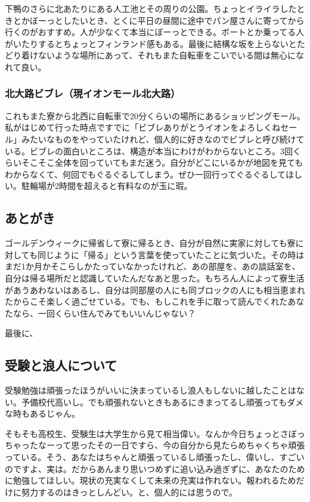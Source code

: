 下鴨のさらに北あたりにある人工池とその周りの公園。ちょっとイライラしたときとかぼーっとしたいとき、とくに平日の昼間に途中でパン屋さんに寄ってから行くのがおすすめ。人が少なくて本当にぼーっとできる。ボートとか乗ってる人がいたりするとちょっとフィンランド感もある。最後に結構な坂を上らないとたどり着けないような場所にあって、それもまた自転車をこいでいる間は無心になれて良い。

\subsubsection{北大路ビブレ（現イオンモール北大路）}
これもまた寮から北西に自転車で20分くらいの場所にあるショッピングモール。私がはじめて行った時点ですでに「ビブレありがとうイオンをよろしくねセール」みたいなものをやっていたけれど、個人的に好きなのでビブレと呼び続けている。ビブレの面白いところは、構造が本当にわけがわからないところ。3回くらいそこそこ全体を回っていてもまだ迷う。自分がどこにいるかが地図を見てもわからなくて、何回でもぐるぐるしてしまう。ぜひ一回行ってぐるぐるしてほしい。駐輪場が2時間を超えると有料なのが玉に瑕。

\subsection{あとがき}
ゴールデンウィークに帰省して寮に帰るとき、自分が自然に実家に対しても寮に対しても同じように「帰る」という言葉を使っていたことに気づいた。その時はまだ1か月かそこらしかたっていなかったけれど、あの部屋を、あの談話室を、自分は帰る場所だと認識していたんだなあと思った。もちろん人によって寮生活があうあわないはあるし、自分は同部屋の人にも同ブロックの人にも相当恵まれたからこそ楽しく過ごせている。でも、もしこれを手に取って読んでくれたあなたなら、一回くらい住んでみてもいいんじゃない？

\tatespace
最後に、
\subsection{受験と浪人について}
受験勉強は頑張ったほうがいいに決まっているし浪人もしないに越したことはない。予備校代高いし。でも頑張れないときもあるにきまってるし頑張ってもダメな時もあるじゃん。

そもそも高校生、受験生は大学生から見て相当偉い。なんか今日ちょっとさぼっちゃったなーって思ったその一日ですら、今の自分から見たらめちゃくちゃ頑張っている。そう、あなたはちゃんと頑張っているし頑張ったし、偉いし、すごいのですよ、実は。だからあんまり思いつめずに追い込み過ぎずに、あなたのために勉強してほしい。現状の充実なくして未来の充実は作れない。報われるためだけに努力するのはきっとしんどい。と、個人的には思うので。

